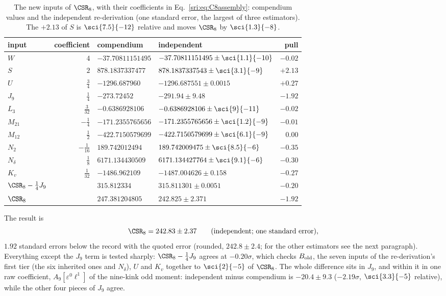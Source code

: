 \begin{table}[htbp]\centering\small
\renewcommand{\arraystretch}{1.15}
\begin{tabular}{@{}lrllr@{}}
\toprule
input & coefficient & compendium & independent & pull\\
\midrule
$W$ & $4$ & $-37.70811151495$ & $-37.70811151495\pm\sci{1.1}{-10}$ & $-0.02$\\
$S$ & $2$ & $878.1837337477$ & $878.1837337543\pm\sci{3.1}{-9}$ & $+2.13$\\
$U$ & $\frac34$ & $-1296.687960$ & $-1296.687551\pm0.0015$ & $+0.27$\\
$J_9$ & $\frac14$ & $-273.72452$ & $-291.94\pm9.48$ & $-1.92$\\
$L_3$ & $\frac3{32}$ & $-0.6386928106$ & $-0.6386928106\pm\sci{9}{-11}$ & $-0.02$\\
$M_{21}$ & $-\frac14$ & $-171.2355765656$ & $-171.2355765656\pm\sci{1.2}{-9}$ & $-0.01$\\
$M_{12}$ & $\frac12$ & $-422.7150579699$ & $-422.7150579699\pm\sci{6.1}{-9}$ & $0.00$\\
$N_2$ & $-\frac1{16}$ & $189.742012494$ & $189.742009475\pm\sci{8.5}{-6}$ & $-0.35$\\
$N_\delta$ & $\frac18$ & $6171.134430509$ & $6171.134427764\pm\sci{9.1}{-6}$ & $-0.30$\\
$K_v$ & $\frac1{32}$ & $-1486.962109$ & $-1487.004626\pm0.158$ & $-0.27$\\
\midrule
$\CSR_8-\frac14J_9$ & & $315.812334$ & $315.811301\pm0.0051$ & $-0.20$\\
$\CSR_8$ & & $247.381204805$ & $242.825\pm2.371$ & $-1.92$\\
\bottomrule
\end{tabular}
\caption{The new inputs of $\CSR_8$, with their coefficients in Eq.~\eqref{sri:eq:C8assembly}: compendium values and the
independent re-derivation (one standard error, the largest of three estimators). The $+2.13$ of $S$ is
$\sci{7.5}{-12}$ relative and moves $\CSR_8$ by $\sci{1.3}{-8}$.}
\label{sri:tab:C8inputs}
\end{table}

The result is
\begin{equation}
 \CSR_8=242.83\pm2.37\qquad(\text{independent; one standard error}),
\end{equation}
$1.92$ standard errors below the record with the quoted error (rounded, $242.8\pm2.4$; for the other
estimators see the next paragraph). Everything
except the $J_9$ term is tested sharply: $\CSR_8-\frac14J_9$ agrees at $-0.20\sigma$, which checks $B_{\rm old}$, the
seven inputs of the re-derivation's first tier (the six inherited ones and $N_\delta$), $U$ and $K_v$ together to
$\sci{2}{-5}$ of $\CSR_8$. The whole difference sits in $J_9$, and within it in one raw coefficient,
$A_9[\varepsilon^0\ell^1]$ of the nine-kink odd moment: independent minus compendium is $-20.4\pm9.3$
($-2.19\sigma$, $\sci{3.3}{-5}$ relative), while the other four pieces of $J_9$ agree.

